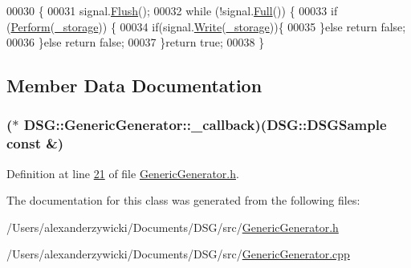 \begin{DoxyCode}
00030                                                                  \{
00031         signal.\hyperlink{class_d_s_g_1_1_ring_buffer_ab23c8003d2857809a816068eeb209d60}{Flush}();
00032         \textcolor{keywordflow}{while} (!signal.\hyperlink{class_d_s_g_1_1_ring_buffer_a53ddb04ffcbb5470a8d2b0a3c65b70cb}{Full}()) \{
00033             \textcolor{keywordflow}{if} (\hyperlink{class_d_s_g_1_1_generic_generator_addcd9abbbf0e31f0af2ff18217a08302}{Perform}(\hyperlink{class_d_s_g_1_1_signal_generator_a28a9b47a1aa0783029f11a19ba0363f2}{\_storage})) \{
00034                 \textcolor{keywordflow}{if}(signal.\hyperlink{class_d_s_g_1_1_ring_buffer_aa5dd2caa0a270173251faee40a43d692}{Write}(\hyperlink{class_d_s_g_1_1_signal_generator_a28a9b47a1aa0783029f11a19ba0363f2}{\_storage}))\{
00035                 \}\textcolor{keywordflow}{else} \textcolor{keywordflow}{return} \textcolor{keyword}{false};
00036             \}\textcolor{keywordflow}{else} \textcolor{keywordflow}{return} \textcolor{keyword}{false};
00037         \}\textcolor{keywordflow}{return} \textcolor{keyword}{true};
00038     \}
\end{DoxyCode}


\subsection{Member Data Documentation}
\hypertarget{class_d_s_g_1_1_generic_generator_a0335953ca594a86f6059d4387e94b73d}{
\subsubsection[{\+\_\+callback}]{($\ast$ D\+S\+G\+::\+Generic\+Generator\+::\+\_\+callback)({\bf D\+S\+G\+::\+D\+S\+G\+Sample} const \&)\hspace{0.3cm}{\ttfamily [protected]}}}\label{class_d_s_g_1_1_generic_generator_a0335953ca594a86f6059d4387e94b73d}


Definition at line \hyperlink{_generic_generator_8h_source_l00021}{21} of file \hyperlink{_generic_generator_8h_source}{Generic\+Generator.\+h}.



The documentation for this class was generated from the following files\+:\begin{DoxyCompactItemize}
\item 
/\+Users/alexanderzywicki/\+Documents/\+D\+S\+G/src/\hyperlink{_generic_generator_8h}{Generic\+Generator.\+h}\item 
/\+Users/alexanderzywicki/\+Documents/\+D\+S\+G/src/\hyperlink{_generic_generator_8cpp}{Generic\+Generator.\+cpp}\end{DoxyCompactItemize}
